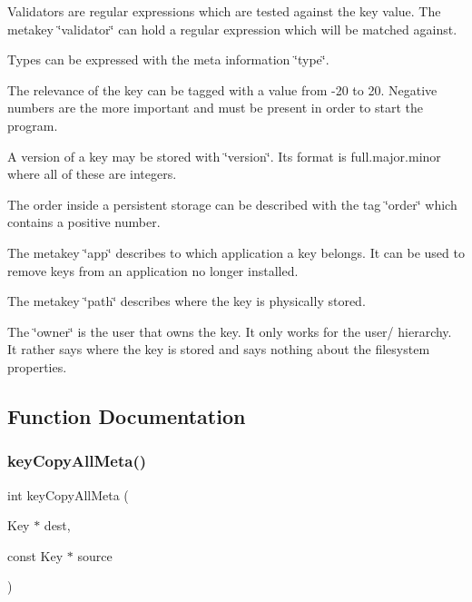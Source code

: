 Validators are regular expressions which are tested against the key value. The metakey \char`\"{}validator\char`\"{} can hold a regular expression which will be matched against.

Types can be expressed with the meta information \char`\"{}type\char`\"{}.

The relevance of the key can be tagged with a value from -\/20 to 20. Negative numbers are the more important and must be present in order to start the program.

A version of a key may be stored with \char`\"{}version\char`\"{}. Its format is full.\+major.\+minor where all of these are integers.

The order inside a persistent storage can be described with the tag \char`\"{}order\char`\"{} which contains a positive number.

The metakey \char`\"{}app\char`\"{} describes to which application a key belongs. It can be used to remove keys from an application no longer installed.

The metakey \char`\"{}path\char`\"{} describes where the key is physically stored.

The \char`\"{}owner\char`\"{} is the user that owns the key. It only works for the user/ hierarchy. It rather says where the key is stored and says nothing about the filesystem properties. 

\subsection{Function Documentation}
\mbox{\label{group__keymeta_ga8e63720a65610a29597494d0671f9401}} 
\subsubsection{\texorpdfstring{key\+Copy\+All\+Meta()}{keyCopyAllMeta()}}
{\footnotesize\ttfamily int key\+Copy\+All\+Meta (\begin{DoxyParamCaption}\item[{Key $\ast$}]{dest,  }\item[{const Key $\ast$}]{source }\end{DoxyParamCaption})}



